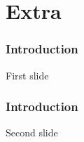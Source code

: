 \section*{Extra}

\begin{frame}
    \frametitle{Introduction}

    First slide

\end{frame}

\begin{frame}
    \frametitle{Introduction}

    Second slide

\end{frame}